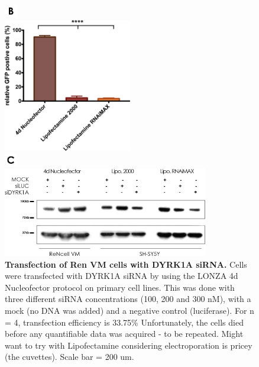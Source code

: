 \documentclass[onecolumn,10pt]{asme2ej}
\begin{document}
\begin{figure}[h]
\includegraphics[width=0.05\textwidth]{figures/b}


		\begin{center}
		\includegraphics[width=0.5\textwidth]{figures/transfection.jpg}		
	\end{center}



\includegraphics[width=0.05\textwidth]{figures/c}


	\begin{center}
		\includegraphics[width=0.8\textwidth]{figures/wb-sirna.jpg}	
	\end{center}
	
	\caption{\textbf{Transfection of Ren VM cells with DYRK1A siRNA.} Cells were transfected with DYRK1A siRNA by using the LONZA 4d Nucleofector protocol on primary cell lines. This was done with three different siRNA concentrations (100, 200 and 300 nM), with a mock (no DNA was added) and a negative control (luciferase). For n = 4, transfection efficiency is 33.75\% Unfortunately, the cells died before any quantifiable data was acquired - to be repeated. Might want to try with Lipofectamine considering electroporation is pricey (the cuvettes).
		Scale bar = 200 um.}
	\label{transfection}
\end{figure}
\end{document}
